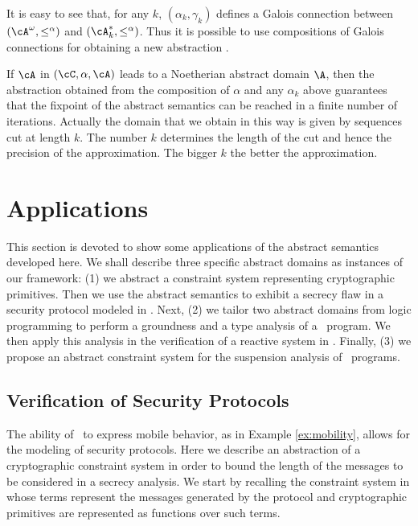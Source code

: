 \documentclass{tlp}
\begin{document}
It is easy to see that, for any $k$, $(\alpha_{k},\gamma_{k})$ 
defines 
a Galois connection between $(\cA^{\omega},\leq^\alpha)$ and $(\cA^{*}_{k},\leq^\alpha)$.
Thus it is possible to use compositions of Galois connections for 
obtaining a new abstraction \cite{CC92}.

If $\cA$ in $(\cC ,\alpha, \cA)$ leads to a  Noetherian abstract domain $\A$, 
then the abstraction obtained from the composition of $\alpha$ and any 
$\alpha_{k}$ above guarantees that the fixpoint of  the abstract semantics 
can be reached in a finite number of iterations. 
Actually the domain that we obtain in this way is given by  
sequences cut at length $k$. The number $k$ determines the length of 
the cut and hence the precision of the approximation. The bigger $k$ 
the better the approximation.









\section{Applications}\label{sec:app}
This section is devoted to show some applications of the abstract semantics developed here. We shall describe  three specific abstract domains as instances of our framework: (1) we abstract a constraint  system  representing cryptographic primitives.  Then we use the  abstract  semantics to exhibit a secrecy flaw in a security protocol modeled in \utcc.   Next, (2) we tailor two abstract domains from logic programming to perform a  groundness 
and a type analysis of a \tccp\ program. We then apply this analysis in the verification of a reactive system in \tccp. Finally, (3) we propose an abstract constraint system for the suspension analysis of \tccp\ programs. 


\subsection{Verification of Security Protocols}\label{sec:appsec}
 The ability of \utcc\ to express mobile behavior, as in Example \ref{ex:mobility},  allows for the  modeling of  security protocols. Here we describe an abstraction of a  cryptographic constraint system  in order to bound the length of the messages to be considered in a secrecy analysis. We start by recalling the constraint system in \cite{Olarte:08:SAC} whose terms represent the  messages  generated by the protocol and cryptographic  primitives are represented as functions over such terms.
\end{document}
